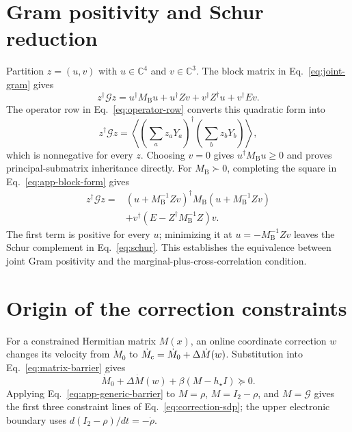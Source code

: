 \documentclass[10pt,twocolumn]{article}
\newcommand{\C}{\mathbb C}
\newcommand{\MB}{M_{\mathrm B}}
\begin{document}
\clearpage
\appendix

\section{Gram positivity and Schur reduction}
\label{app:gram-schur}

Partition $z=(u,v)$ with $u\in\C^4$ and $v\in\C^3$.  The block matrix in
Eq.~\eqref{eq:joint-gram} gives
\begin{equation}
z^\dagger\mathcal Gz
=u^\dagger\MB u+u^\dagger Zv+v^\dagger Z^\dagger u+v^\dagger Ev.
\label{eq:app-block-form}
\end{equation}
The operator row in Eq.~\eqref{eq:operator-row} converts this quadratic form
into
\begin{equation}
z^\dagger\mathcal Gz
=\left\langle\left(\sum_a z_aY_a\right)^\dagger
\left(\sum_b z_bY_b\right)\right\rangle,
\label{eq:app-gram-form}
\end{equation}
which is nonnegative for every $z$.  Choosing $v=0$ gives
$u^\dagger\MB u\geq0$ and proves principal-submatrix inheritance directly.
For $\MB\succ0$, completing the square in Eq.~\eqref{eq:app-block-form}
gives~\cite{zhang2005}
\begin{equation}
\begin{aligned}
z^\dagger\mathcal Gz={}&
(u+\MB^{-1}Zv)^\dagger\MB(u+\MB^{-1}Zv)\\
&+v^\dagger(E-Z^\dagger\MB^{-1}Z)v.
\end{aligned}
\label{eq:app-square}
\end{equation}
The first term is positive for every $u$; minimizing it at
$u=-\MB^{-1}Zv$ leaves the Schur complement in
Eq.~\eqref{eq:schur}.  This establishes the equivalence between joint Gram
positivity and the marginal-plus-cross-correlation condition.

\section{Origin of the correction constraints}
\label{app:constraint-origin}

For a constrained Hermitian matrix $M(x)$, an online coordinate correction
$w$ changes its velocity from $\dot M_0$ to
$\dot M_{\rm c}=\dot M_0+\Delta\dot M(w)$.  Substitution into
Eq.~\eqref{eq:matrix-barrier} gives
\begin{equation}
\dot M_0+\Delta\dot M(w)+\beta(M-h_\star I)\succeq0.
\label{eq:app-generic-barrier}
\end{equation}
Applying Eq.~\eqref{eq:app-generic-barrier} to $M=\rho$, $M=I_2-\rho$,
and $M=\mathcal G$ gives the first three constraint lines of
Eq.~\eqref{eq:correction-sdp}; the upper electronic boundary uses
$d(I_2-\rho)/dt=-\dot\rho$.
\end{document}
